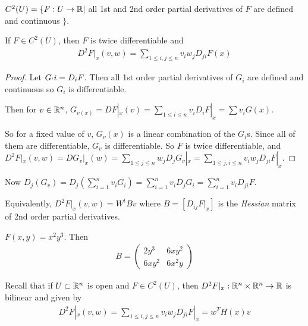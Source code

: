 \documentclass[a4paper]{article}
\begin{document}
\begin{defi}
$C^2 (U) = \{ F:U \to \mathbb{R}|$ all 1st and 2nd order partial derivatives of $F$ are defined and continuous $\}$.
\end{defi}

\begin{prop}
If $F \in C^2 (U)$, then $F$ is twice differentiable and
\begin{equation*}
\begin{aligned}
D^2 F|_x (v,w) = \sum_{1 \leq i,j \leq n} v_i w_j D_{ji} F(x)
\end{aligned}
\end{equation*}
\begin{proof}
Let $G_`i = D_i F$. Then all 1st order partial derivatives of $G_i$ are defined and continuous so $G_i$ is differentiable.

Then for $v \in \mathbb{R}^n$, $G_{v(x)} = DF|_x(v) = \sum_{1 \leq i \leq n} v_i D_i F|_x = \sum v_i G(x)$.

So for a fixed value of $v$, $G_v(x)$ is a linear combination of the $G_i$s. Since all of them are differentiable, $G_v$ is differentiable. So $F$ is twice differentiable, and $D^2 F|_x(v,w) = DG_v|_x(w) = \sum_{1 \leq j \leq n} w_j D_j G_v|_x = \sum_{1 \leq j,i\leq n} v_i w_j D_{ji} F|_x$.
\end{proof}
\end{prop}

Now $D_j (G_v) = D_j (\sum_{i=1}^n v_i G_i) = \sum_{i=1}^n v_i D_j G_i = \sum_{i=1}^n v_i D_{ji} F$.

Equivalently, $D^2 F|_x (v,w) = W^t B v$ where $B=[D_{ij}F|_x]$ is the \emph{Hessian} matrix of 2nd order partial derivatives.

\begin{eg}
$F(x,y)=x^2 y^3$. Then
\begin{equation*}
\begin{aligned}
B=\left(\begin{matrix}
2y^3 & 6xy^2\\
6xy^2 & 6x^2y
\end{matrix}\right)
\end{aligned}
\end{equation*}
\end{eg}

Recall that if $U \subset \mathbb{R}^n$ is open and $F \in C^2(U)$, then $D^2 F|_x: \mathbb{R}^n \times \mathbb{R}^n \to \mathbb{R}$ is bilinear and given by
\begin{equation*}
\begin{aligned}
D^2 F|_x (v,w) = \sum_{1 \leq i,j\leq n} v_i w_j D_{ji}F|_x = w^T H(x) v
\end{aligned}
\end{equation*}
\end{document}
